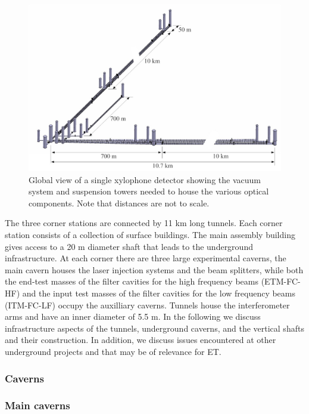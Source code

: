 \begin{figure}[htbp!]
\centering
\includegraphics[width=14cm]{./Sec_SiteInfra/Figures/infra2.jpg}
\caption{Global view of a single xylophone detector showing the vacuum system and suspension towers needed to house the various optical components. Note that distances are not to scale.}
\label{fig:infra2}
\end{figure}

The three corner stations are connected by 11 km long tunnels. Each corner station
consists of a collection of surface buildings. The main assembly building gives
access to a 20 m diameter shaft that leads to the underground infrastructure.
At each corner there are three large experimental caverns, the main
cavern houses the laser injection systems and the beam splitters, while
both the end-test masses of the filter cavities for the high frequency beams
(ETM-FC-HF) and the input test masses of the filter cavities for the low
frequency beams (ITM-FC-LF) occupy the auxilliary caverns. 
Tunnels house the interferometer arms and have an inner diameter
of 5.5 m. In the following we discuss infrastructure aspects of 
the tunnels, underground caverns, and the vertical shafts and their construction.
In addition, we discuss issues encountered at other underground projects
and that may be of relevance for ET.

\subsubsection{Caverns}

\subsubsection*{Main caverns}

